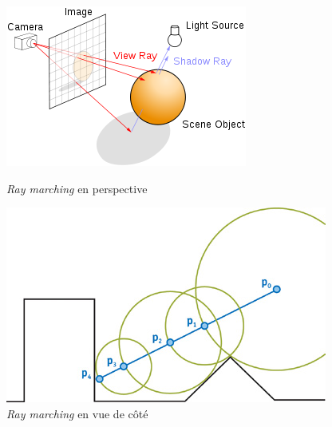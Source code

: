 \begin{figure}[h]
  \begin{minipage}[b]{0.45\linewidth}
    \centering
    \includegraphics[width=\linewidth]{images//raymarching/raymarching00.png}
    \caption{\textit{Ray marching} en perspective}
    \label{raymarching00}
  \end{minipage}
  \hspace{0.1\linewidth} %
  \begin{minipage}[b]{0.45\linewidth}
    \centering
    \includegraphics[width=\linewidth]{images//raymarching/raymarching01.png}
    \caption{\textit{Ray marching} en vue de côté}
    \label{raymarching01}
  \end{minipage}
\end{figure}

